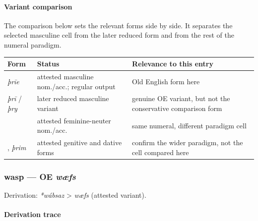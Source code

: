 \documentclass[
  british,
  a4paper,
]{article}
\newcounter{none} %
\begin{document}
\paragraph{Variant comparison}\label{variant-comparison-2}

The comparison below sets the relevant forms side by side. It separates
the selected masculine cell from the later reduced form and from the
rest of the numeral paradigm.

{\def\LTcaptype{none} %
\begin{longtable}[]{@{}
  >{\raggedright\arraybackslash}p{}
  >{\raggedright\arraybackslash}p{}
  >{\raggedright\arraybackslash}p{}@{}}
\toprule\noalign{}
\begin{minipage}[b]{\linewidth}\raggedright
Form
\end{minipage} & \begin{minipage}[b]{\linewidth}\raggedright
Status
\end{minipage} & \begin{minipage}[b]{\linewidth}\raggedright
Relevance to this entry
\end{minipage} \\
\midrule\noalign{}
\endhead
\bottomrule\noalign{}
\endlastfoot
{\emph{þrīe}} & attested masculine nom./acc.; regular output & Old
English form here \\
\emph{þrī} / \emph{þry} & later reduced masculine variant & genuine OE
variant, but not the conservative comparison form \\
{\emph{þrēo}} & attested feminine-neuter nom./acc. & same numeral,
different paradigm cell \\
{\emph{þrēora}}, {\emph{þrim}} & attested genitive and dative forms &
confirm the wider paradigm, not the cell compared here \\
\end{longtable}
}

\subsubsection{\texorpdfstring{wasp --- OE
\emph{wæfs}}{wasp --- OE wæfs}}\label{wasp-oe-wuxe6fs}

Derivation: \emph{*wábsaz} \textgreater{} \emph{wæfs} (attested
variant).

\paragraph{Derivation trace}\label{derivation-trace-110}
\end{document}

